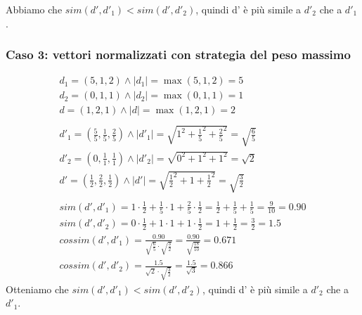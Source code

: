 \documentclass{report}
\begin{document}
	Abbiamo che $sim(d',d'_1) < sim(d',d'_2)$, quindi d' è più simile a $d'_2$ che a $d'_1$.

	\subsubsection{Caso 3: vettori normalizzati con strategia del peso massimo}
	\[
	\begin{array}{l}
		d_1 = (5,1,2) \land |d_1| = \max(5,1,2) = 5\\
		d_2 = (0,1,1) \land |d_2| = \max(0,1,1) = 1\\
		d = (1,2,1) \land |d| = \max(1,2,1) = 2\\\\
		d'_1 = \left( \frac{5}{5}, \frac{1}{5}, \frac{2}{5} \right) \land |d'_1| = \sqrt{1^2 + \frac{1}{5}^2 + \frac{2}{5}^2} = \sqrt{\frac{6}{5}}\\
		d'_2 = \left( 0, \frac{1}{1}, \frac{1}{1} \right) \land |d'_2| = \sqrt{0^2 + 1^2 + 1^2} = \sqrt{2}\\
		d' = \left( \frac{1}{2}, \frac{2}{2}, \frac{1}{2} \right) \land |d'| = \sqrt{\frac{1}{2}^2 + 1 + \frac{1}{2}^2} = \sqrt{\frac{3}{2}}\\\\
		sim(d',d'_1) = 1 \cdot \frac{1}{2} + \frac{1}{5} \cdot 1 + \frac{2}{5} \cdot \frac{1}{2} = \frac{1}{2} + \frac{1}{5} + \frac{1}{5} = \frac{9}{10} = 0.90\\
		sim(d',d'_2) = 0 \cdot \frac{1}{2} + 1 \cdot 1 + 1 \cdot \frac{1}{2} = 1 + \frac{1}{2} = \frac{3}{2} = 1.5\\
		cossim(d',d'_1) = \frac{0.90}{\sqrt{\frac{6}{5}} \cdot \sqrt{\frac{3}{2}}} = \frac{0.90}{\sqrt{\frac{18}{10}}} = 0.671\\
		cossim(d',d'_2) = \frac{1.5}{\sqrt{2} \cdot \sqrt{\frac{3}{2}}} = \frac{1.5}{\sqrt{3}} = 0.866 
	\end{array}
	\]
	Otteniamo che $sim(d',d'_1) < sim(d',d'_2)$, quindi d' è più simile a $d'_2$ che a $d'_1$.

\end{document}
